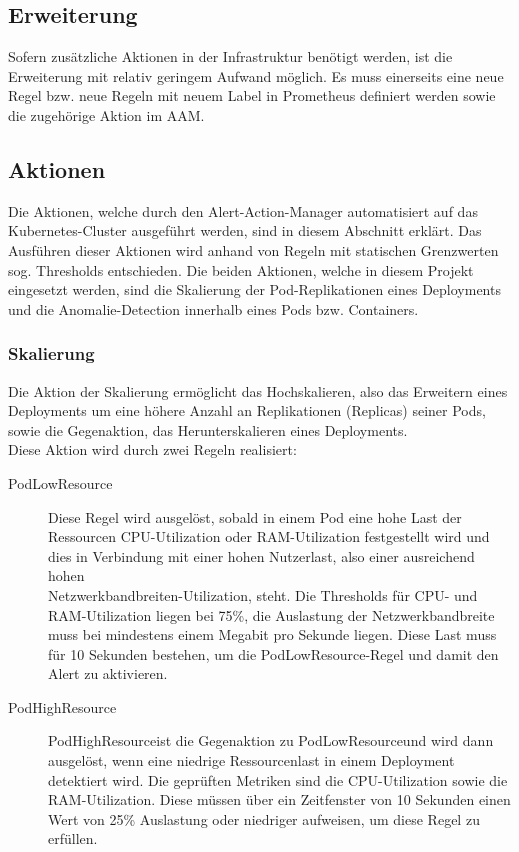 \documentclass[a4paper,10pt]{scrartcl}
\begin{document}
\subsection{Erweiterung}

Sofern zusätzliche Aktionen in der Infrastruktur benötigt werden, ist die Erweiterung mit relativ geringem Aufwand möglich. Es muss einerseits eine neue Regel bzw. neue Regeln mit neuem Label in Prometheus definiert werden sowie die zugehörige Aktion im AAM.

\subsection{Aktionen}

Die Aktionen, welche durch den Alert-Action-Manager automatisiert auf das Kubernetes-Cluster ausgeführt werden, sind in diesem Abschnitt erklärt. Das Ausführen dieser Aktionen wird anhand von Regeln mit statischen Grenzwerten sog. Thresholds entschieden.
Die beiden Aktionen, welche in diesem Projekt eingesetzt werden, sind die Skalierung der Pod-Replikationen eines Deployments und die Anomalie-Detection innerhalb eines Pods bzw. Containers.

\subsubsection{Skalierung}

Die Aktion der Skalierung ermöglicht das Hochskalieren, also das Erweitern eines Deployments um eine höhere Anzahl an Replikationen (Replicas) seiner Pods, sowie die Gegenaktion, das Herunterskalieren eines Deployments.\\
Diese Aktion wird durch zwei Regeln realisiert:

\begin{description}
\item[PodLowResource]

Diese Regel wird ausgelöst, sobald in einem Pod eine hohe Last der Ressourcen CPU-Utilization oder RAM-Utilization festgestellt wird und dies in Verbindung mit einer hohen Nutzerlast, also einer ausreichend hohen\\ Netzwerkbandbreiten-Utilization, steht. Die Thresholds für CPU- und RAM-Utilization liegen bei 75\%, die Auslastung der Netzwerkbandbreite muss bei mindestens einem Megabit pro Sekunde liegen. Diese Last muss für 10 Sekunden bestehen, um die \glqq PodLowResource\grqq -Regel und damit den Alert zu aktivieren.

\item[PodHighResource]

\glqq PodHighResource\grqq ist die Gegenaktion zu \glqq PodLowResource\grqq und wird dann ausgelöst, wenn 
eine niedrige Ressourcenlast in einem Deployment detektiert wird. Die geprüften Metriken sind die CPU-Utilization sowie die RAM-Utilization. Diese müssen über ein Zeitfenster von 10 Sekunden einen Wert von 25\% Auslastung oder niedriger aufweisen, um diese Regel zu erfüllen.

\end{description}
\end{document}

